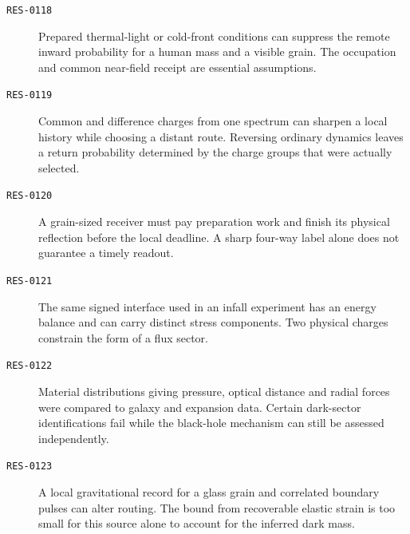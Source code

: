\begin{description}
\item[\textnormal{\texttt{RES-0118}}] Prepared thermal-light or cold-front conditions can suppress the remote inward probability for a human mass and a visible grain. The occupation and common near-field receipt are essential assumptions.
\item[\textnormal{\texttt{RES-0119}}] Common and difference charges from one spectrum can sharpen a local history while choosing a distant route. Reversing ordinary dynamics leaves a return probability determined by the charge groups that were actually selected.
\item[\textnormal{\texttt{RES-0120}}] A grain-sized receiver must pay preparation work and finish its physical reflection before the local deadline. A sharp four-way label alone does not guarantee a timely readout.
\item[\textnormal{\texttt{RES-0121}}] The same signed interface used in an infall experiment has an energy balance and can carry distinct stress components. Two physical charges constrain the form of a flux sector.
\item[\textnormal{\texttt{RES-0122}}] Material distributions giving pressure, optical distance and radial forces were compared to galaxy and expansion data. Certain dark-sector identifications fail while the black-hole mechanism can still be assessed independently.
\item[\textnormal{\texttt{RES-0123}}] A local gravitational record for a glass grain and correlated boundary pulses can alter routing. The bound from recoverable elastic strain is too small for this source alone to account for the inferred dark mass.
\end{description}

